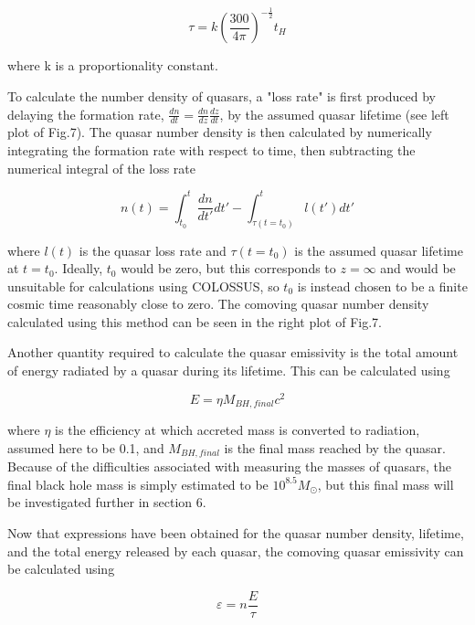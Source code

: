 \documentclass[12pt, twocolumn]{report}%
\begin{document}
\begin{equation}
    \tau=k\left(\frac{300}{4\pi}\right)^{-\frac{1}{2}}t_H
\end{equation}

\noindent where k is a proportionality constant.\par

To calculate the number density of quasars, a "loss rate" is first produced by delaying the formation rate, $\frac{dn}{dt}=\frac{dn}{dz}\frac{dz}{dt}$, by the assumed quasar lifetime (see left plot of Fig.7). The quasar number density is then calculated by numerically integrating the formation rate with respect to time, then subtracting the numerical integral of the loss rate

\begin{equation}
    n(t)=\int_{t_0}^t\frac{dn}{dt'}dt'-\int_{\tau(t=t_0)}^tl(t')dt'
\end{equation}

\noindent where $l(t)$ is the quasar loss rate and $\tau(t=t_0)$ is the assumed quasar lifetime at $t=t_0$. Ideally, $t_0$ would be zero, but this corresponds to $z=\infty$ and would be unsuitable for calculations using COLOSSUS, so $t_0$ is instead chosen to be a finite cosmic time reasonably close to zero. The comoving quasar number density calculated using this method can be seen in the right plot of Fig.7.\par

Another quantity required to calculate the quasar emissivity is the total amount of energy radiated by a quasar during its lifetime. This can be calculated using

\begin{equation}
    E=\eta M_{BH,final}c^2
\end{equation}

\noindent where $\eta$ is the efficiency at which accreted mass is converted to radiation, assumed here to be 0.1, and $M_{BH,final}$ is the final mass reached by the quasar. Because of the difficulties associated with measuring the masses of quasars, the final black hole mass is simply estimated to be $10^{8.5}M_\odot$, but this final mass will be investigated further in section 6.\par

Now that expressions have been obtained for the quasar number density, lifetime, and the total energy released by each quasar, the comoving quasar emissivity can be calculated using

\begin{equation}
    \varepsilon=n\frac{E}{\tau}
\end{equation}
\end{document}
